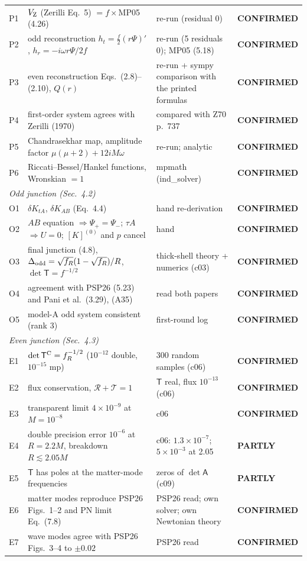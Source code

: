 \documentclass[11pt,a4paper]{article}
\newcommand{\sq}{\sqrt{f_R}}
\newcommand{\OK}{\textcolor{green!50!black}{\textbf{CONFIRMED}}}
\newcommand{\PART}{\textcolor{orange!85!black}{\textbf{PARTLY}}}
\begin{document}
{\begin{longtable}{p{0.6cm}p{7.3cm}p{4.2cm}p{2.7cm}}
P1 & $V_{\rm Z}$ (Zerilli Eq.~5) $=f\times$MP05 (4.26) & re-run (residual 0) & \OK\\
P2 & odd reconstruction $h_t=\tfrac f2(r\Psi)'$, $h_r=-i\omega r\Psi/2f$ & re-run (5 residuals 0); MP05 (5.18) & \OK\\
P3 & even reconstruction Eqs.~(2.8)--(2.10), $Q(r)$ & re-run + sympy comparison with the printed formulas & \OK\\
P4 & first-order system agrees with Zerilli (1970) & compared with Z70 p.~737 & \OK\\
P5 & Chandrasekhar map, amplitude factor $\mu(\mu+2)+12iM\omega$ & re-run; analytic & \OK\\
P6 & Riccati--Bessel/Hankel functions, Wronskian $=1$ & mpmath (ind\_solver) & \OK\\
\multicolumn{4}{l}{\emph{Odd junction (Sec.~4.2)}}\\
O1 & $\delta K_{tA}$, $\delta K_{AB}$ (Eq.~4.4) & hand re-derivation & \OK\\
O2 & $AB$ equation $\Rightarrow\Psi_+=\Psi_-$; $\tau A$ $\Rightarrow U=0$; $[K]^{(0)}$ and $p$ cancel & hand & \OK\\
O3 & final junction (4.8), $\Delta_{\rm odd}=\sq(1-\sq)/R$, $\det\mathsf T=f^{-1/2}$ & thick-shell theory + numerics (c03) & \OK\\
O4 & agreement with PSP26 (5.23) and Pani et al.\ (3.29), (A35) & read both papers & \OK\\
O5 & model-A odd system consistent (rank 3) & first-round log & \OK\\
\multicolumn{4}{l}{\emph{Even junction (Sec.~4.3)}}\\
E1 & $\det\mathsf T^{\rm C}=f_R^{-1/2}$ ($10^{-12}$ double, $10^{-15}$ mp) & 300 random samples (c06) & \OK\\
E2 & flux conservation, $\mathcal R+\mathcal T=1$ & $\mathsf T$ real, flux $10^{-13}$ (c06) & \OK\\
E3 & transparent limit $4\times10^{-9}$ at $M=10^{-8}$ & c06 & \OK\\
E4 & double precision error $10^{-6}$ at $R=2.2M$, breakdown $R\lesssim2.05M$ & c06: $1.3\times10^{-7}$; $5\times10^{-3}$ at 2.05 & \PART\\
E5 & $\mathsf T$ has poles at the matter-mode frequencies & zeros of $\det\mathsf A$ (c09) & \PART\\
E6 & matter modes reproduce PSP26 Figs.~1--2 and PN limit Eq.~(7.8) & PSP26 read; own solver; own Newtonian theory & \OK\\
E7 & wave modes agree with PSP26 Figs.~3--4 to $\pm0.02$ & PSP26 read & \OK\\

\end{longtable}}
\end{document}
